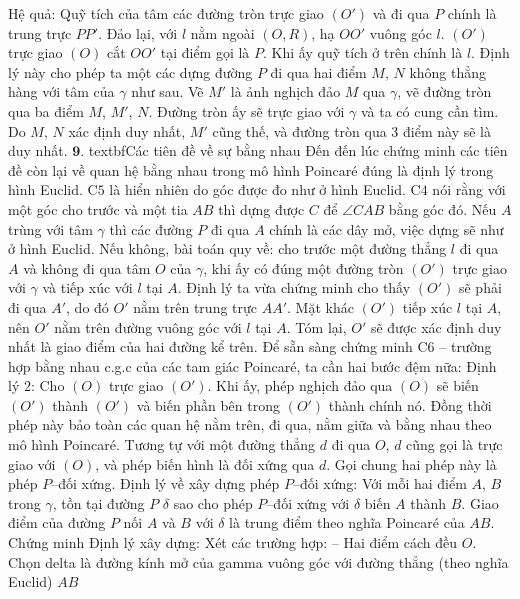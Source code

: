 \documentclass{article}
\begin{document}
	\vskip 0.1cm
	Hệ quả: Quỹ tích của tâm các đường tròn trực giao $(O')$ và đi qua $P$ chính là trung trực $PP'$.
	\vskip 0.1cm
	Đảo lại, với $l$ nằm ngoài $(O, R)$, hạ $OO'$ vuông góc $l$. $(O')$ trực giao $(O)$ cắt $OO'$ tại điểm gọi là $P$. Khi ấy quỹ tích ở trên chính là $l$.
	\vskip 0.1cm
	Định lý này cho phép ta một các dựng đường $P$ đi qua hai điểm $M$, $N$ không thẳng hàng với tâm của $\gamma$ như sau. Vẽ $M'$ là ảnh nghịch đảo $M$ qua $\gamma$, vẽ đường tròn qua ba điểm $M$, $M'$, $N$. Đường tròn ấy sẽ trực giao với $\gamma$ và ta có cung cần tìm. Do $M$, $N$ xác định duy nhất, $M'$ cũng thế, và đường tròn qua $3$ điểm này sẽ là duy nhất.
	\vskip 0.1cm
	$\pmb{9.}$ textbf{\color{lichsutoanhoc}Các tiên đề về sự bằng nhau}
	\vskip 0.1cm
	Đến đến lúc chứng minh các tiên đề còn lại về quan hệ bằng nhau trong mô hình Poincaré đúng là định lý trong hình Euclid.
	\vskip 0.1cm
	C$5$ là hiển nhiên do góc được đo như ở hình Euclid. C$4$ nói rằng với một góc cho trước và một tia $AB$ thì dựng được $C$ để $ \angle CAB$ bằng góc đó. Nếu $A$ trùng với tâm $ \gamma$ thì các đường $P$ đi qua $A$ chính là các dây mở, việc dựng sẽ như ở hình Euclid.
	\vskip 0.1cm
	Nếu không, bài toán quy về: cho trước một đường thẳng $l$ đi qua $A$ và không đi qua tâm $O$ của $\gamma$, khi ấy có đúng một đường tròn $(O')$ trực giao với $\gamma$ và tiếp xúc với $l$ tại $A$. 
	\vskip 0.1cm
	Định lý ta vừa chứng minh cho thấy $(O')$ sẽ phải đi qua $A'$, do đó $O'$ nằm trên trung trực $AA'$. Mặt khác $(O')$ tiếp xúc $l$ tại $A$, nên $O'$ nằm trên đường vuông góc với $l$ tại $A$. Tóm lại, $O'$ sẽ được xác định duy nhất là giao điểm của hai đường kể trên.
	\vskip 0.1cm
	Để sẵn sàng chứng minh C$6$ -- trường hợp bằng nhau c.g.c của các tam giác Poincaré, ta cần hai bước đệm nữa:
	\vskip 0.1cm
	Định lý $2$: Cho $(O)$ trực giao $(O')$. Khi ấy, phép nghịch đảo qua $(O)$ sẽ biến $(O')$ thành $(O')$ và biến phần bên trong $(O')$ thành chính nó. Đồng thời phép này bảo toàn các quan hệ nằm trên, đi qua, nằm giữa và bằng nhau theo mô hình Poincaré. Tương tự với một đường thẳng $d$ đi qua $O$, $d$ cũng gọi là trực giao với $(O)$, và phép biến hình là đối xứng qua $d$. Gọi chung hai phép này là phép $P$--đối xứng.
	\vskip 0.1cm
	Định lý về xây dựng phép $P$--đối xứng: Với mỗi hai điểm $A$, $B$ trong $\gamma$, tồn tại đường $P$ $\delta$ sao cho phép $P$--đối xứng với $\delta$ biến $A$ thành $B$. Giao điểm của đường $P$ nối $A$ và $B$ với $\delta$ là trung điểm theo nghĩa Poincaré của $AB$.
	\vskip 0.1cm
	Chứng minh Định lý xây dựng: Xét các trường hợp:
	\vskip 0.1cm
	-- Hai điểm cách đều $O$. Chọn delta là đường kính mở của gamma vuông góc với đường thẳng (theo nghĩa Euclid) $AB$
\end{document}
